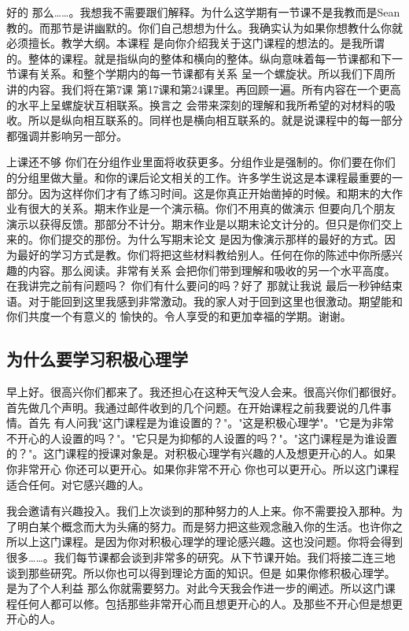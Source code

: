 好的 那么……。我想我不需要跟们解释。为什么这学期有一节课不是我教而是Sean教的。而那节是讲幽默的。你们自己想想为什么。我确实认为如果你想教什么你就必须擅长。教学大纲。本课程 是向你介绍我关于这门课程的想法的。是我所谓的。整体的课程。就是指纵向的整体和横向的整体。纵向意味着每一节课都和下一节课有关系。和整个学期内的每一节课都有关系 呈一个螺旋状。所以我们下周所讲的内容。我们将在第7课 第17课和第24课里。再回顾一遍。所有内容在一个更高的水平上呈螺旋状互相联系。换言之 会带来深刻的理解和我所希望的对材料的吸收。所以是纵向相互联系的。同样也是横向相互联系的。就是说课程中的每一部分都强调并影响另一部分。 

上课还不够 你们在分组作业里面将收获更多。分组作业是强制的。你们要在你们的分组里做大量。和你的课后论文相关的工作。许多学生说这是本课程最重要的一部分。因为这样你们才有了练习时间。这是你真正开始凿掉的时候。和期末的大作业有很大的关系。期末作业是一个演示稿。你们不用真的做演示 但要向几个朋友演示以获得反馈。那部分不计分。期末作业是以期末论文计分的。但只是你们交上来的。你们提交的那份。为什么写期末论文 是因为像演示那样的最好的方式。因为最好的学习方式是教。你们将把这些材料教给别人。任何在你的陈述中你所感兴趣的内容。那么阅读。非常有关系 会把你们带到理解和吸收的另一个水平高度。在我讲完之前有问题吗？ 你们有什么要问的吗？好了 那就让我说 最后一秒钟结束语。对于能回到这里我感到非常激动。我的家人对于回到这里也很激动。期望能和你们共度一个有意义的 愉快的。令人享受的和更加幸福的学期。谢谢。 

\subsection{为什么要学习积极心理学} 

早上好。很高兴你们都来了。我还担心在这种天气没人会来。很高兴你们都很好。首先做几个声明。我通过邮件收到的几个问题。在开始课程之前我要说的几件事情。首先 有人问我"这门课程是为谁设置的？"。"这是积极心理学"。"它是为非常不开心的人设置的吗？"。"它只是为抑郁的人设置的吗？"。"这门课程是为谁设置的？"。这门课程的授课对象是。对积极心理学有兴趣的人及想更开心的人。如果你非常开心 你还可以更开心。如果你非常不开心 你也可以更开心。所以这门课程适合任何。对它感兴趣的人。 

我会邀请有兴趣投入。我们上次谈到的那种努力的人上来。你不需要投入那种。为了明白某个概念而大为头痛的努力。而是努力把这些观念融入你的生活。也许你之所以上这门课程。是因为你对积极心理学的理论感兴趣。这也没问题。你将会得到很多……。我们每节课都会谈到非常多的研究。从下节课开始。我们将接二连三地谈到那些研究。所以你也可以得到理论方面的知识。但是 如果你修积极心理学。是为了个人利益 那么你就需要努力。对此今天我会作进一步的阐述。所以这门课程任何人都可以修。包括那些非常开心而且想更开心的人。及那些不开心但是想更开心的人。 

